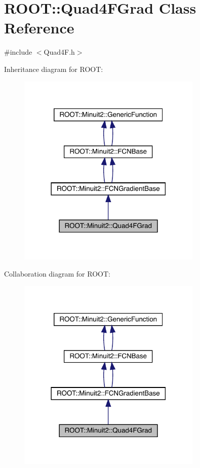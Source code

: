 \hypertarget{classROOT_1_1Minuit2_1_1Quad4FGrad}{}\section{R\+O\+OT\+:\+:Quad4\+F\+Grad Class Reference}
\label{classROOT_1_1Minuit2_1_1Quad4FGrad}


{\ttfamily \#include $<$Quad4\+F.\+h$>$}



Inheritance diagram for R\+O\+OT\+:\nopagebreak
\begin{figure}[H]
\begin{center}
\leavevmode
\includegraphics[width=249pt]{d5/d99/classROOT_1_1Minuit2_1_1Quad4FGrad__inherit__graph}
\end{center}
\end{figure}


Collaboration diagram for R\+O\+OT\+:\nopagebreak
\begin{figure}[H]
\begin{center}
\leavevmode
\includegraphics[width=249pt]{dd/d3b/classROOT_1_1Minuit2_1_1Quad4FGrad__coll__graph}
\end{center}
\end{figure}
